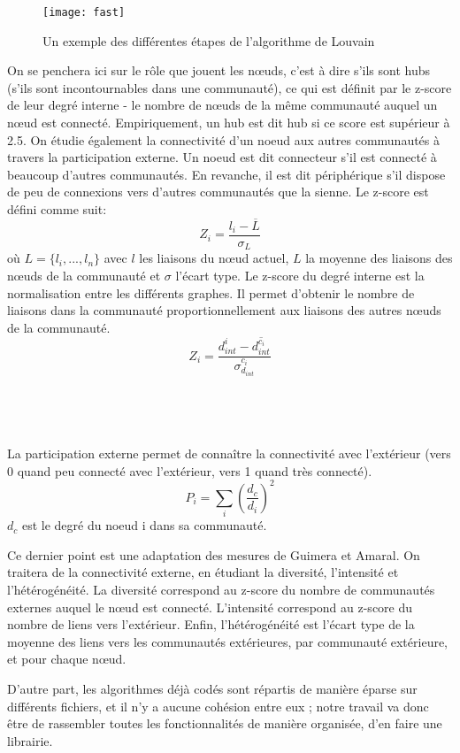 \begin{titlepage}
{\begin{description}
\newpage
\begin{figure}[ht]
\centering
\texttt{[image: fast]}
\caption{Un exemple des différentes étapes de l'algorithme de Louvain}
\end{figure}
\item[Guimera et Amaral :]  On se penchera ici sur le rôle que jouent les nœuds, c'est à dire s'ils sont hubs (s'ils sont incontournables dans une communauté), ce qui est définit par le z-score de leur degré interne - le nombre de nœuds de la m\^eme communauté auquel un nœud est connecté. Empiriquement, un hub est dit hub si ce score est supérieur à 2.5. On étudie également la connectivité d'un noeud aux autres communautés à travers la participation externe. Un noeud est dit connecteur s'il est connecté à beaucoup d'autres communautés. En revanche, il est dit périphérique s'il dispose de peu de connexions vers d'autres communautés que la sienne. Le z-score est défini comme suit: \[Z_i=\frac{l_i-\overline{L}}{\sigma_L}\] où $L = \{l_i,...,l_n\} $ avec $l$ les liaisons du nœud actuel, $L$ la moyenne des liaisons des nœuds de la communauté et $\sigma$ l'écart type. Le z-score du degré interne est la normalisation entre les différents graphes. Il permet d'obtenir le nombre de liaisons dans la communauté proportionnellement aux liaisons des autres nœuds de la communauté.\\ \[Z_i=\frac{d_{int}^i - \overline{d_{int}^{c_i}}}{\sigma_{d_{int}}^{c_i}}\] \\ \\ \\ \\La participation externe permet de connaître la connectivité avec l'extérieur (vers 0 quand peu connecté avec l'extérieur, vers 1 quand très connecté). \[P_i=\sum_i\left(\frac{d_c}{d_i}\right)^2\] $d_c$ est le degré du noeud i dans sa communauté.\cite{GA}
\newline
\item[Dugué et Perez  :] Ce dernier point est une adaptation des mesures de Guimera et Amaral. On traitera de la connectivité externe, en étudiant la diversité, l'intensité et l'hétérogénéité. La diversité correspond au z-score du nombre de communautés externes auquel le nœud est connecté. L'intensité correspond au z-score du nombre de liens vers l'extérieur. Enfin, l'hétérogénéité est l'écart type de la moyenne des liens vers les communautés extérieures, par communauté extérieure, et pour chaque nœud. \cite{NDAP1}\cite{NDAP2}  \\ 
\end{description} 
D'autre part, les algorithmes déjà codés sont répartis de manière éparse sur différents fichiers, et il n'y a aucune cohésion entre eux ; notre travail va donc être de rassembler toutes les fonctionnalités de manière organisée, d'en faire une librairie.
}


\end{titlepage}
